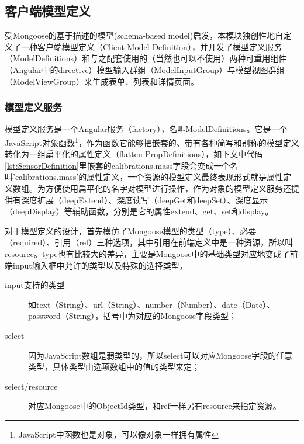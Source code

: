 \subsection{客户端模型定义}
受Mongoose的基于描述的模型(schema-based model)启发，本模块独创性地自定义了一种客户端模型定义（Client Model Definition），并开发了模型定义服务（ModelDefinitions）和与之配套使用的（当然也可以不使用）两种可重用组件（Angular中的directive）模型输入群组（ModelInputGroup）与模型视图群组（ModelViewGroup）来生成表单、列表和详情页面。

\subsubsection{模型定义服务}
模型定义服务是一个Angular服务（factory），名叫ModelDefinitions。它是一个JavaScript对象函数\footnote{JavaScript中函数也是对象，可以像对象一样拥有属性}，作为函数它能够把嵌套的、带有各种简写和别称的模型定义转化为一组扁平化的属性定义（flatten PropDefinitions），如下文中代码\ref{lst:SensorDefinition}里嵌套的calibrations.mass字段会变成一个名叫'calibrations.mass'的属性定义，一个资源的模型定义最终表现形式就是属性定义数组。为方便使用扁平化的名字对模型进行操作，作为对象的模型定义服务还提供有深度扩展（deepExtend）、深度读写（deepGet和deepSet）、深度显示（deepDisplay）等辅助函数，分别是它的属性extend、get、set和display。

对于模型定义的设计，首先模仿了Mongoose模型的类型（type）、必要（required）、引用（ref）三种选项，其中引用在前端定义中是一种资源，所以叫resource。type也有比较大的差异，主要是Mongoose中的基础类型对应地变成了前端input输入框中允许的类型以及特殊的选择类型，
\begin{description}
  \item[input支持的类型] 如text（String）、url（String）、number（Number）、date（Date）、password（String），括号中为对应的Mongoose字段类型；
  \item[select] 因为JavaScript数组是弱类型的，所以select可以对应Mongoose字段的任意类型，具体类型由选项数组中的值的类型来定；
  \item[select/resource] 对应Mongoose中的ObjectId类型，和ref一样另有resource来指定资源。
\end{description}

